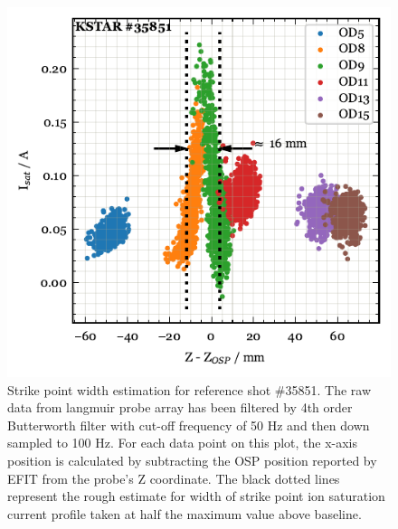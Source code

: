 \begin{figure}[!ht]
 \centering
 \includegraphics[width=\linewidth]{figures/StrikePointWidth_35851.pdf}
 \caption{
Strike point width estimation for reference shot \#35851.
The raw data from langmuir probe array has been filtered by 4th order Butterworth filter with cut-off frequency of 50 Hz and then down sampled to 100 Hz.
For each data point on this plot, the x-axis position is calculated by subtracting the \ac{OSP} position reported by EFIT from the probe's Z coordinate.
The black dotted lines represent the rough estimate for width of strike point ion saturation current profile taken at half the maximum value above baseline.
}
 \label{fig:strike_point_width}
\end{figure}